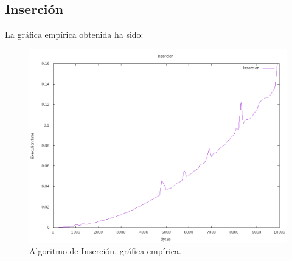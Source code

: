\subsection{Inserción}

La gráfica empírica obtenida ha sido:
\begin{figure}[H]
	\centering
	\includegraphics[scale=0.5]{imagenes/insercion.png}
	\caption{Algoritmo de Inserción, gráfica empírica.}
	\label{fig:E6}
\end{figure}



